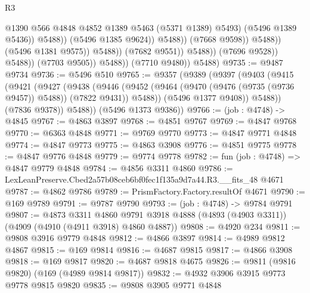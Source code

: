 \begin{lexlean}{R3}
\begin{coremodule}
                                                    @1390
                                                    @566
                                                    @4848
                                                    @4852
                                                    @1389
                                                    @5463
                                                    (@5371 @1389)
                                                    @5493)
                                                  (@5496 @1389 @5436))
                                                @5488))
                                            (@5496 @1385 @9624))
                                          @5488))
                                      (@7668 @9598))
                                    @5488))
                                (@5496 @1381 @9575))
                              @5488))
                          (@7682 @9551))
                        @5488))
                    (@7696 @9528))
                  @5488))
              (@7703 @9505))
            @5488))
        (@7710 @9480))
      @5488)
@9735 := @9487 @9734
@9736 := @5496 @510
@9765 := @9357
    (@9389
      (@9397
        (@9403
          (@9415
            (@9421
              (@9427
                (@9438
                  (@9446
                    (@9452 (@9464 (@9470 (@9476 (@9735 (@9736 @9457)) @5488)) (@7822 @9431)) @5488))
                  (@5496 @1377 @9408))
                @5488))
            (@7836 @9378))
          @5488))
      (@5496 @1373 @9386))
@9766 := (job : @4748) -> @4845
@9767 := @4863 @3897
@9768 := @4851 @9767
@9769 := @4847 @9768
@9770 := @6363 @4848
@9771 := @9769 @9770
@9773 := @4847 @9771 @4848
@9774 := @4847 @9773
@9775 := @4863 @3908
@9776 := @4851 @9775
@9778 := @4847 @9776 @4848
@9779 := @9774 @9778
@9782 := fun (job : @4748) => @4847 @9779 @4848
@9784 := @4856 @3311 @4860
@9786 := LexLeanPreserve.Cbed2a57b08ceb6bf0fec1f135a9d7a44.R3.__fits_48 @4671
@9787 := @4862 @9786
@9789 := PrismFactory.Factory.resultOf @4671
@9790 := @169 @9789
@9791 := @9787 @9790
@9793 := (job : @4748) -> @9784 @9791
@9807 := @4873
    @3311
    @4860
    @9791
    @3918
    @4888
    (@4893 (@4903 @3311))
    (@4909 (@4910 (@4911 @3918) @4860 @4887))
@9808 := @4920 @234
@9811 := @9808 @3916 @9779 @4848
@9812 := @4866 @3897
@9814 := @4989 @9812 @4867
@9815 := @169 @9814
@9816 := @4687 @9815
@9817 := @4866 @3908
@9818 := @169 @9817
@9820 := @4687 @9818 @4675
@9826 := @9811 (@9816 @9820) (@169 (@4989 @9814 @9817))
@9832 := @4932 @3906 @3915 @9773 @9778 @9815 @9820
@9835 := @9808 @3905 @9771 @4848

\end{coremodule}
\end{lexlean}
